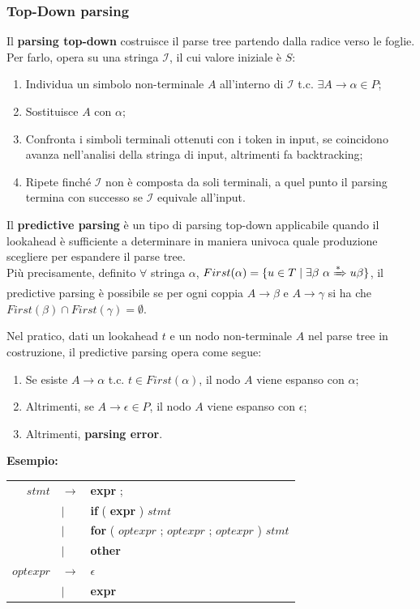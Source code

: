 \documentclass[12pt]{article}
\begin{document}
\subsubsection{Top-Down parsing}
\begin{definition}
Il \textbf{parsing top-down} costruisce il parse tree partendo dalla radice verso le foglie.
Per farlo, opera su una stringa $\mathcal{I}$, il cui valore iniziale è $S$:
\begin{enumerate}
    \item Individua un simbolo non-terminale $A$ all'interno di $\mathcal{I}$ t.c. $\exists A \rightarrow \alpha \in P$;
    \item Sostituisce $A$ con $\alpha$;
    \item Confronta i simboli terminali ottenuti con i token in input, se coincidono avanza nell'analisi della stringa di input, altrimenti fa backtracking;
    \item Ripete finché $\mathcal{I}$ non è composta da soli terminali, a quel punto il parsing termina con successo se $\mathcal{I}$ equivale all'input.
\end{enumerate}
\end{definition}
\begin{definition}
Il \textbf{predictive parsing} è un tipo di parsing top-down applicabile quando il lookahead è sufficiente a determinare in maniera univoca quale produzione scegliere per espandere il parse tree.\\
Più precisamente, definito $\forall$ stringa $\alpha$, $First(\alpha) = \{u \in T \mid \exists \beta \ \alpha \xRightarrow{*} u\beta\}$, il predictive parsing è possibile se per ogni coppia $A \rightarrow \beta$ e $A \rightarrow \gamma$ si ha che $First(\beta) \cap First(\gamma) = \emptyset$.
\end{definition}
\noindent Nel pratico, dati un lookahead $t$ e un nodo non-terminale $A$ nel parse tree in costruzione, il predictive parsing opera come segue:
\begin{enumerate}
    \item Se esiste $A \rightarrow \alpha$ t.c. $t \in First(\alpha)$, il nodo $A$ viene espanso con $\alpha$;
    \item Altrimenti, se $A \rightarrow \epsilon \in P$, il nodo $A$ viene espanso con $\epsilon$;
    \item Altrimenti, \textbf{parsing error}.
\end{enumerate} 
\textbf{Esempio:}
\begin{center}
\begin{tabular}{rll}
    $stmt$ & $\to$ & \textbf{expr} ; \\
           & $|$   & \textbf{if} ( \textbf{expr} ) $stmt$ \\
           & $|$   & \textbf{for} ( $optexpr$ ; $optexpr$ ; $optexpr$ ) $stmt$ \\
           & $|$   & \textbf{other} \\
    $optexpr$ & $\to$ & $\epsilon$ \\
           & $|$   & \textbf{expr} \\
\end{tabular}
\end{center}
\end{document}
